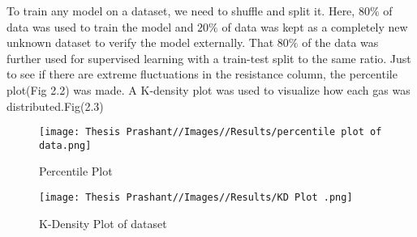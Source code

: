 To train any model on a dataset, we need to shuffle and split it. Here, $80\%$ of data was used to train the model and $20\%$ of data was kept as a completely new unknown dataset to verify the model externally. That $80\%$ of the data was further used for supervised learning with a train-test split to the same ratio.
Just to see if there are extreme fluctuations in the resistance column, the percentile plot(Fig 2.2) was made. A K-density plot was used to visualize how each gas was distributed.Fig(2.3)

\begin{figure}
    \centering
    \texttt{[image: Thesis Prashant//Images//Results/percentile plot of data.png]}
    \caption{Percentile Plot}
    \label{fig:enter-label}
\end{figure}
\begin{figure}
    \centering
    \texttt{[image: Thesis Prashant//Images//Results/KD Plot .png]}
    \caption{K-Density Plot of dataset}
    \label{fig:enter-label}
\end{figure}